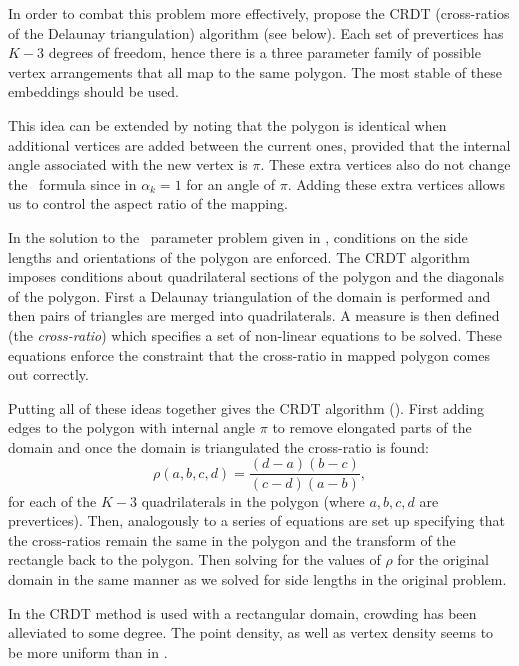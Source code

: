 In order to combat this problem more effectively,  propose the CRDT (cross-ratios of the Delaunay triangulation) algorithm (see below). Each set of prevertices has $K-3$ degrees of freedom, hence there is a three parameter family of possible vertex arrangements that all map to the same polygon. The most stable of these embeddings should be used.

This idea can be extended by noting that the polygon is identical when additional vertices are added between the current ones, provided that the internal angle associated with the new vertex is $\pi$. These extra vertices also do not change the \sch\ formula since in  $\alpha_k=1$ for an angle of $\pi$. Adding these extra vertices allows us to control the aspect ratio of the mapping.

In the solution to the \sch\ parameter problem given in , conditions on the side lengths and orientations of the polygon are enforced. The CRDT algorithm imposes conditions about quadrilateral sections of the polygon and the diagonals of the polygon. First a Delaunay triangulation of the domain is performed and then pairs of triangles are merged into quadrilaterals. A measure is then defined (the \emph{cross-ratio}) which specifies a set of non-linear equations to be solved. These equations enforce the constraint that the cross-ratio in mapped polygon comes out correctly. 

Putting all of these ideas together gives the CRDT algorithm (\cite[pp. 30-39]{driscoll}). First adding edges to the polygon with internal angle $\pi$ to remove elongated parts of the domain and once the domain is triangulated the cross-ratio is found:
\begin{equation}
\rho(a,b,c,d) = \frac{(d-a)(b-c)}{(c-d)(a-b)},
\end{equation}
for each of the $K-3$ quadrilaterals in the polygon (where $a,b,c,d$ are prevertices). Then, analogously to  a series of equations are set up specifying that the cross-ratios remain the same in the polygon and the transform of the rectangle back to the polygon. Then solving for the values of $\rho$ for the original domain in the same manner as we solved for side lengths in the original problem. 

In  the CRDT method is used with a rectangular domain, crowding has been alleviated to some degree. The point density, as well as vertex density seems to be more uniform than in .

